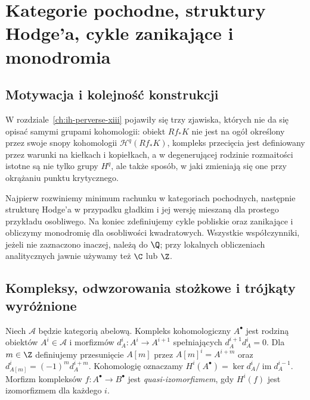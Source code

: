 \chapter{Kategorie pochodne, struktury Hodge'a, cykle zanikające i monodromia}
\label{ch:xiv-hodge-monodromia}

\providecommand{\atlasref}[2]{#2}

\section{Motywacja i kolejność konstrukcji}
W rozdziale~\ref{ch:ih-perverse-xiii} pojawiły się trzy zjawiska,
których nie da się opisać samymi grupami kohomologii:
obiekt $Rf_*K$ nie jest na ogół określony przez swoje snopy
kohomologii $\mathcal H^q(Rf_*K)$, kompleks przecięcia jest definiowany przez
warunki na kiełkach i kopiełkach, a w degenerującej rodzinie
rozmaitości istotne są nie tylko grupy $H^q$, ale także sposób,
w jaki zmieniają się one przy okrążaniu punktu krytycznego.

Najpierw rozwiniemy minimum rachunku w kategoriach pochodnych,
następnie strukturę Hodge'a w przypadku gładkim i jej wersję
mieszaną dla prostego przykładu osobliwego. Na koniec
zdefiniujemy cykle pobliskie oraz zanikające i obliczymy
monodromię dla osobliwości kwadratowych.
Wszystkie współczynniki, jeżeli nie zaznaczono inaczej, należą
do $\Q$; przy lokalnych obliczeniach analitycznych jawnie
używamy też $\C$ lub $\Z$.

\section{Kompleksy, odwzorowania stożkowe i trójkąty wyróżnione}
\begin{definicja}
Niech $\mathcal A$ będzie kategorią abelową. Kompleks
kohomologiczny $A^\bullet$ jest rodziną obiektów
$A^i\in\mathcal A$ i morfizmów
$d_A^i:A^i\to A^{i+1}$ spełniających
$d_A^{i+1}d_A^i=0$. Dla $m\in\Z$ definiujemy
przesunięcie $A[m]$ przez
$A[m]^i=A^{i+m}$ oraz $d_{A[m]}^i=(-1)^m d_A^{i+m}$.
Kohomologię oznaczamy
$H^i(A^\bullet)=\ker d_A^i/\operatorname{im}d_A^{i-1}$.
Morfizm kompleksów $f:A^\bullet\to B^\bullet$ jest
\emph{quasi-izomorfizmem}, gdy $H^i(f)$ jest izomorfizmem
dla każdego $i$.
\end{definicja}

